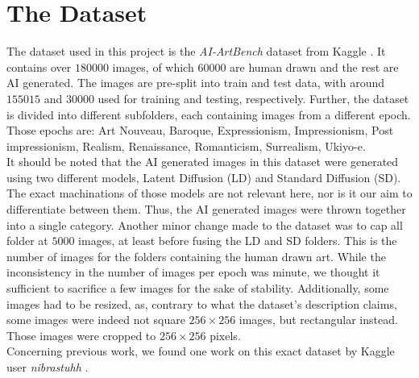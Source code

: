 \chapter{The Dataset}
\label{ch:dataset}

The dataset used in this project is the \textit{AI-ArtBench} dataset from Kaggle \cite{aiartbench}.
It contains over $180000$ images, of which $60000$ are human drawn and the rest are AI generated.
The images are pre-split into train and test data, with around $155015$ and $30000$ used for training and testing, respectively.
Further, the dataset is divided into different subfolders, each containing images from a different epoch.
Those epochs are: Art Nouveau, Baroque, Expressionism, Impressionism, Post impressionism, Realism, Renaissance, Romanticism, Surrealism, Ukiyo-e. \\

It should be noted that the AI generated images in this dataset were generated using two different models, Latent Diffusion (LD) and Standard Diffusion (SD).
The exact machinations of those models are not relevant here, nor is it our aim to differentiate between them.
Thus, the AI generated images were thrown together into a single category.
Another minor change made to the dataset was to cap all folder at $5000$ images, at least before fusing the LD and SD folders.
This is the number of images for the folders containing the human drawn art.
While the inconsistency in the number of images per epoch was minute, we thought it sufficient to sacrifice a few images for the sake of stability.
Additionally, some images had to be resized, as, contrary to what the dataset's description claims, some images were indeed not square $256 \times 256$ images,
but rectangular instead.
Those images were cropped to $256 \times 256$ pixels. \\

Concerning previous work, we found one work on this exact dataset by Kaggle user \textit{nibrastuhh} \cite{useraiartbench}.